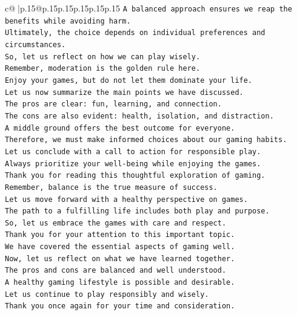 \documentclass{article}
\begin{document}
{\begin{supertabular}{c@{$\;$}|p{.15\linewidth}@{}p{.15\linewidth}p{.15\linewidth}p{.15\linewidth}p{.15\linewidth}p{.15\linewidth}}
{{{\texttt{A balanced approach ensures we reap the benefits while avoiding harm.  } \\
\texttt{Ultimately, the choice depends on individual preferences and circumstances.  } \\
\texttt{So, let us reflect on how we can play wisely.  } \\
\texttt{Remember, moderation is the golden rule here.  } \\
\texttt{Enjoy your games, but do not let them dominate your life.  } \\
\texttt{Let us now summarize the main points we have discussed.  } \\
\texttt{The pros are clear: fun, learning, and connection.  } \\
\texttt{The cons are also evident: health, isolation, and distraction.  } \\
\texttt{A middle ground offers the best outcome for everyone.  } \\
\texttt{Therefore, we must make informed choices about our gaming habits.  } \\
\texttt{Let us conclude with a call to action for responsible play.  } \\
\texttt{Always prioritize your well{-}being while enjoying the games.  } \\
\texttt{Thank you for reading this thoughtful exploration of gaming.  } \\
\texttt{Remember, balance is the true measure of success.  } \\
\texttt{Let us move forward with a healthy perspective on games.  } \\
\texttt{The path to a fulfilling life includes both play and purpose.  } \\
\texttt{So, let us embrace the games with care and respect.  } \\
\texttt{Thank you for your attention to this important topic.  } \\
\texttt{We have covered the essential aspects of gaming well.  } \\
\texttt{Now, let us reflect on what we have learned together.  } \\
\texttt{The pros and cons are balanced and well understood.  } \\
\texttt{A healthy gaming lifestyle is possible and desirable.  } \\
\texttt{Let us continue to play responsibly and wisely.  } \\
\texttt{Thank you once again for your time and consideration.  } \\
}}}
\end{supertabular}}
\end{document}
